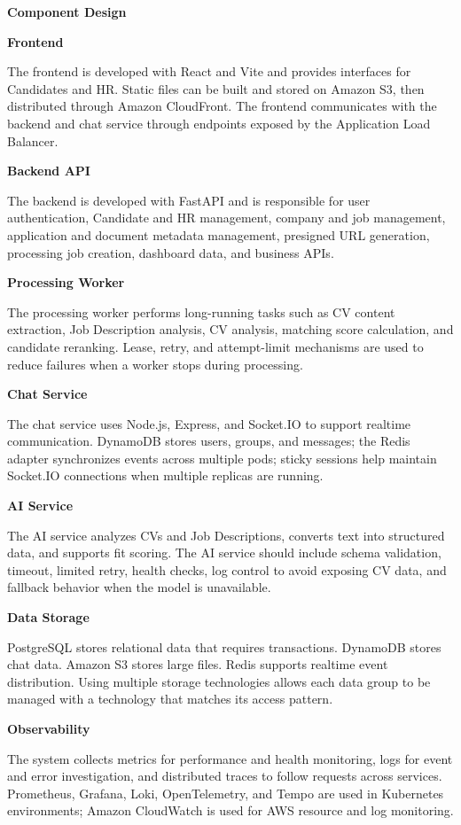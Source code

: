 \vspace{0.5em}\noindent\textbf{Component Design}\par

\textbf{Frontend}

The frontend is developed with React and Vite and provides interfaces
for Candidates and HR. Static files can be built and stored on Amazon
S3, then distributed through Amazon CloudFront. The frontend
communicates with the backend and chat service through endpoints exposed
by the Application Load Balancer.

\textbf{Backend API}

The backend is developed with FastAPI and is responsible for user
authentication, Candidate and HR management, company and job management,
application and document metadata management, presigned URL generation,
processing job creation, dashboard data, and business APIs.

\textbf{Processing Worker}

The processing worker performs long-running tasks such as CV content
extraction, Job Description analysis, CV analysis, matching score
calculation, and candidate reranking. Lease, retry, and attempt-limit
mechanisms are used to reduce failures when a worker stops during
processing.

\textbf{Chat Service}

The chat service uses Node.js, Express, and Socket.IO to support
realtime communication. DynamoDB stores users, groups, and messages; the
Redis adapter synchronizes events across multiple pods; sticky sessions
help maintain Socket.IO connections when multiple replicas are running.

\textbf{AI Service}

The AI service analyzes CVs and Job Descriptions, converts text into
structured data, and supports fit scoring. The AI service should include
schema validation, timeout, limited retry, health checks, log control to
avoid exposing CV data, and fallback behavior when the model is
unavailable.

\textbf{Data Storage}

PostgreSQL stores relational data that requires transactions. DynamoDB
stores chat data. Amazon S3 stores large files. Redis supports realtime
event distribution. Using multiple storage technologies allows each data
group to be managed with a technology that matches its access pattern.

\textbf{Observability}

The system collects metrics for performance and health monitoring, logs
for event and error investigation, and distributed traces to follow
requests across services. Prometheus, Grafana, Loki, OpenTelemetry, and
Tempo are used in Kubernetes environments; Amazon CloudWatch is used for
AWS resource and log monitoring.


